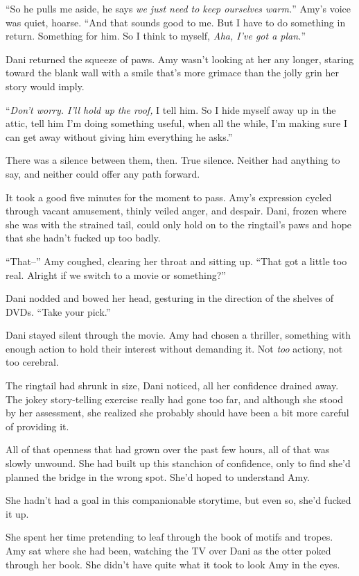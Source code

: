 ``So he pulls me aside, he says \emph{we just need to keep ourselves warm.}'' Amy's voice was quiet, hoarse. ``And that sounds good to me. But I have to do something in return. Something for him. So I think to myself, \emph{Aha, I've got a plan.}''

Dani returned the squeeze of paws. Amy wasn't looking at her any longer, staring toward the blank wall with a smile that's more grimace than the jolly grin her story would imply.

``\emph{Don't worry. I'll hold up the roof,} I tell him. So I hide myself away up in the attic, tell him I'm doing something useful, when all the while, I'm making sure I can get away without giving him everything he asks.''

There was a silence between them, then. True silence. Neither had anything to say, and neither could offer any path forward.

It took a good five minutes for the moment to pass. Amy's expression cycled through vacant amusement, thinly veiled anger, and despair. Dani, frozen where she was with the strained tail, could only hold on to the ringtail's paws and hope that she hadn't fucked up too badly.

``That--'' Amy coughed, clearing her throat and sitting up. ``That got a little too real. Alright if we switch to a movie or something?''

Dani nodded and bowed her head, gesturing in the direction of the shelves of DVDs. ``Take your pick.''

\secdiv{}

\noindent Dani stayed silent through the movie. Amy had chosen a thriller, something with enough action to hold their interest without demanding it. Not \emph{too} actiony, not too cerebral.

The ringtail had shrunk in size, Dani noticed, all her confidence drained away. The jokey story-telling exercise really had gone too far, and although she stood by her assessment, she realized she probably should have been a bit more careful of providing it.

All of that openness that had grown over the past few hours, all of that was slowly unwound. She had built up this stanchion of confidence, only to find she'd planned the bridge in the wrong spot. She'd hoped to understand Amy.

She hadn't had a goal in this companionable storytime, but even so, she'd fucked it up.

She spent her time pretending to leaf through the book of motifs and tropes. Amy sat where she had been, watching the TV over Dani as the otter poked through her book. She didn't have quite what it took to look Amy in the eyes.

